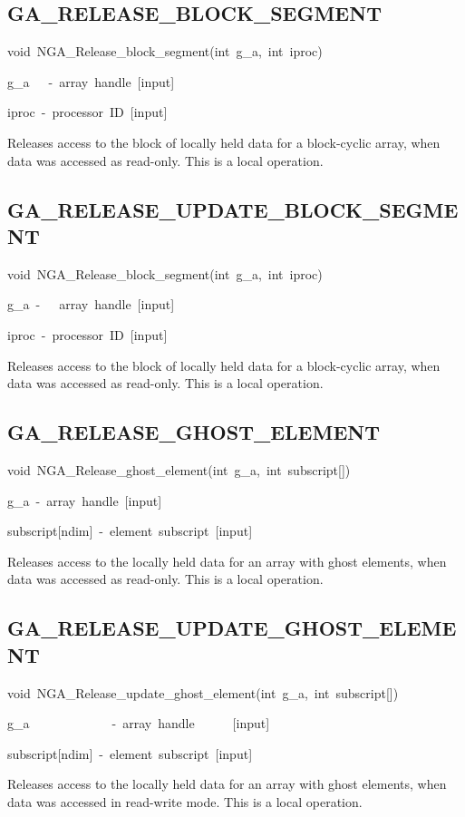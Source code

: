 \subsection*{\label{sub:GA_RELEASE_BLOCK_SEGMENT}GA\_RELEASE\_BLOCK\_SEGMENT}
\begin{lyxcode}
void~NGA\_Release\_block\_segment(int~g\_a,~int~iproc)



g\_a~~~-~array~handle~{[}input{]}

iproc~-~processor~ID~{[}input{]}
\end{lyxcode}
Releases access to the block of locally held data for a block-cyclic
array, when data was accessed as read-only. This is a local operation. 


\subsection*{\label{sub:GA_RELEASE_UPDATE_BLOCK_SEGMENT}GA\_RELEASE\_UPDATE\_BLOCK\_SEGMENT}
\begin{lyxcode}
void~NGA\_Release\_block\_segment(int~g\_a,~int~iproc)



g\_a~-~~~array~handle~{[}input{]}~

iproc~-~processor~ID~{[}input{]}
\end{lyxcode}
Releases access to the block of locally held data for a block-cyclic
array, when data was accessed as read-only. This is a local operation. 


\subsection*{\label{sub:GA_RELEASE_GHOST_ELEMENT}GA\_RELEASE\_GHOST\_ELEMENT}
\begin{lyxcode}
void~NGA\_Release\_ghost\_element(int~g\_a,~int~subscript{[}{]})



g\_a~-~array~handle~{[}input{]}~

subscript{[}ndim{]}~-~element~subscript~{[}input{]}
\end{lyxcode}
Releases access to the locally held data for an array with ghost elements,
when data was accessed as read-only. This is a local operation. 


\subsection*{\label{sub:GA_RELEASE_UPDATE_GHOST_ELEMENT}GA\_RELEASE\_UPDATE\_GHOST\_ELEMENT}
\begin{lyxcode}
void~NGA\_Release\_update\_ghost\_element(int~g\_a,~int~subscript{[}{]})



g\_a~~~~~~~~~~~~~-~array~handle~~~~~~{[}input{]}

subscript{[}ndim{]}~-~element~subscript~{[}input{]}
\end{lyxcode}
Releases access to the locally held data for an array with ghost elements,
when data was accessed in read-write mode. This is a local operation. 


